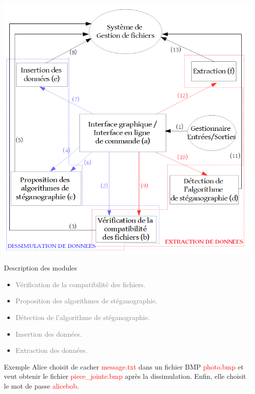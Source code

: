 \documentclass{beamer}
\begin{document}
  \begin{frame}
  \hspace{1.5cm}
  \includegraphics[scale=0.25]{pictures/organigramme_extraction.png}
  \end{frame}
  
  \begin{frame} %
	\begin{block}{Description des modules}
	\begin{itemize}
	[circle]
	\item \textcolor{gray} {Vérification de la compatibilité des fichiers.}
	\item \textcolor{gray} {Proposition des algorithmes de stéganographie.}
	\item \textcolor{gray} {Détection de l'algorithme de stéganographie.}
	\item \textcolor{gray} {Insertion des données.}
	\item \textcolor{gray} {Extraction des données.}
	\end{itemize}
	\end{block}
	
	\begin{exampleblock}{Exemple} 
	Alice choisit de cacher \textcolor{red}{message.txt} dans un fichier 
	BMP \textcolor{red}{photo.bmp} et veut obtenir le fichier 
	\textcolor{red}{piece\_jointe.bmp} après la 
	dissimulation. Enfin, elle choisit le mot de passe \textcolor{red}{alicebob}. 
	\end{exampleblock}
  \end{frame}
  
\end{document}
